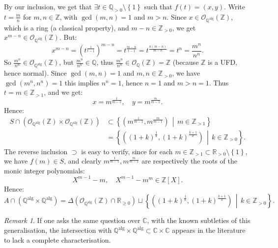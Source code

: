 \documentclass[11pt, a4paper, oneside]{article}
\theoremstyle{remark}
\newtheorem*{remark}{Remark}
\theoremstyle{lemma}
\begin{document}
By our inclusion, we get that \( \exists t \in \mathbb{Q}_{>0} \setminus \left\{ 1 \right\} \) such that \( f(t) = (x, y) \). Write \( t = \frac{m}{n} \) for \( m,n \in \mathbb{Z} \), with \( \gcd(m,n) = 1 \) and \( m > n \). Since \( x \in \mathcal{O}_{\mathbb{Q}^{\mathrm{alg}}}(\mathbb{Z}) \), which is a ring (a classical property), and \( m - n \in \mathbb{Z}_{>0} \), we get \( x^{m-n} \in \mathcal{O}_{\mathbb{Q}^{\mathrm{alg}}}(\mathbb{Z}) \). But:
\[
x^{m-n} = \left( t^{\frac{1}{t-1}} \right)^{m-n} =  t^{\frac{m-n}{t-1}} = t^{\frac{n(m-n)}{m-n}} = t^{n} = \frac{m^{n}}{n^{n}}.
\]
So \( \frac{m^{n}}{n^{n}} \in \mathcal{O}_{\mathbb{Q}^{\mathrm{alg}}}(\mathbb{Z}) \), but \( \frac{m^{n}}{n^{n}} \in \mathbb{Q} \), thus \( \frac{m^{n}}{n^{n}} \in \mathcal{O}_{\mathbb{Q}}(\mathbb{Z}) = \mathbb{Z} \) (because \( \mathbb{Z} \) is a UFD, hence normal). Since \( \gcd(m,n) = 1 \) and \( m,n\in\mathbb{Z}_{>0}\), we have \( \gcd(m^n,n^n) = 1 \) this implies \( n^{n} = 1 \), hence \( n = 1 \) and $m>n=1$. Thus \( t = m \in \mathbb{Z}_{>1} \), and we get:
\[
x = m^{\frac{1}{m-1}}, \quad y = m^{\frac{m}{m-1}}.
\]
Hence:
\begin{align*}
S \cap \left( \mathcal{O}_{\mathbb{Q}^{\mathrm{alg}}}(\mathbb{Z}) \times \mathcal{O}_{\mathbb{Q}^{\mathrm{alg}}}(\mathbb{Z}) \right)&\subset \left\{ \left( m^{\frac{1}{m-1}}, m^{\frac{m}{m-1}} \right) \,\middle|\, m \in \mathbb{Z}_{>1} \right\}\\&= \left\{ \left( (1+k)^{\frac{1}{k}}, (1+k)^{\frac{k+1}{k}} \right) \,\middle|\, k \in \mathbb{Z}_{>0} \right\}.
\end{align*}
The reverse inclusion \( \supset \) is easy to verify, since for each \( m \in \mathbb{Z}_{>1} \subset \mathbb{R}_{>0} \setminus \left\{ 1 \right\} \), we have \( f(m) \in S \), and clearly \( m^{\frac{1}{m-1}}, m^{\frac{m}{m-1}} \) are respectively the roots of the monic integer polynomials:
\[
X^{m-1} - m, \quad X^{m-1} - m^{m} \in \mathbb{Z}[X].
\]
Hence:
\[
A \cap \left( \mathbb{Q}^{\mathrm{alg}} \times \mathbb{Q}^{\mathrm{alg}} \right) = \Delta\left( \mathcal{O}_{\mathbb{Q}^{\mathrm{alg}}}(\mathbb{Z}) \cap \mathbb{R}_{\geq 0} \right) \sqcup \left\{ \left( (1+k)^{\frac{1}{k}}, (1+k)^{\frac{k+1}{k}} \right) \,\middle|\, k \in \mathbb{Z}_{>0} \right\}.
\]
\begin{remark}
   If one asks the same question over \( \mathbb{C} \), with the known subtleties of this generalisation, the intersection with \( \mathbb{Q}^{\mathrm{alg}} \times \mathbb{Q}^{\mathrm{alg}} \subset \mathbb{C} \times \mathbb{C} \) appears in the literature to lack a complete characterisation.
\end{remark}
\end{document}
